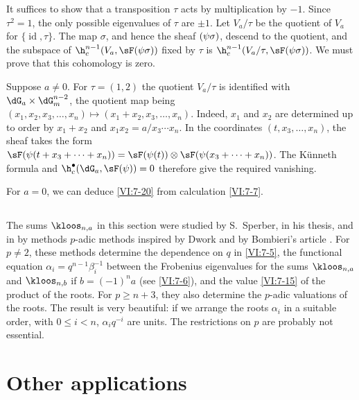 \documentclass[oneside]{book}
\begin{document}
It suffices to show that a transposition $\tau$ acts by multiplication 
by $-1$. Since $\tau^2=1$, the only possible eigenvalues of $\tau$ are 
$\pm 1$. Let $V_a/\tau$ be the quotient of $V_a$ for 
$\{\operatorname{id},\tau\}$. The map $\sigma$, and hence the sheaf 
$\sf(\psi\sigma)$, descend to the quotient, and the subspace of 
  $\h_c^{n-1}(V_a,\sF(\psi\sigma))$ fixed by 
$\tau$ is $\h_c^{n-1}(V_a/\tau,\sF(\psi\sigma))$. We must prove that 
this cohomology is zero. 

Suppose $a\ne 0$. For $\tau=(1,2)$ the quotient $V_a/\tau$ is identified 
with $\dG_a\times \dG_m^{n-2}$, the quotient map being 
$(x_1,x_2,x_3,\dots,x_n)\mapsto (x_1+x_2,x_3,\dots,x_n)$. Indeed, $x_1$ and 
$x_2$ are determined up to order by $x_1+x_2$ and 
$x_1x_2 = a/x_3\dotsm x_n$. In the coordinates $(t,x_3,\dots,x_n)$, the 
sheaf takes the form 
$\sF(\psi(t+x_3+\cdots + x_n)) = \sF(\psi(t))\otimes \sF(\psi(x_3+\cdots + x_n))$. 
  The K\"unneth formula and $\h_c^\bullet(\dG_a,\sF(\psi)) = 0$ therefore give 
the required vanishing. 

For $a=0$, we can deduce \ref{VI:7-20} from calculation \ref{VI:7-7}. 





\subsection{}\label{VI:7-21}

The sums $\kloos_{n,a}$ in this section were studied by 
S.\ Sperber, in his thesis, and in \cite{sp77} by methods 
$p$-adic methods inspired by Dwork and by Bombieri's article \cite{bo66}. 
For $p\ne 2$, these methods determine the dependence on $q$ in \ref{VI:7-5}, 
the functional equation $\alpha_i = q^{n-1} \beta_i^{-1}$ between the 
Frobenius eigenvalues for the sums $\kloos_{n,a}$ and 
$\kloos_{n,b}$ if $b=(-1)^n a$ (see \ref{VI:7-6}), and the value \ref{VI:7-15} 
of the product of the roots. For $p\geqslant n+3$, they also determine the 
$p$-adic valuations of the roots. The result is very beautiful: if we arrange 
the roots $\alpha_i$ in a suitable order, with 
  $0\leqslant i<n$, $\alpha_i q^{-i}$ are units. The 
restrictions on $p$ are probably not essential. 










\section{Other applications}\label{VI:8}
\end{document}
